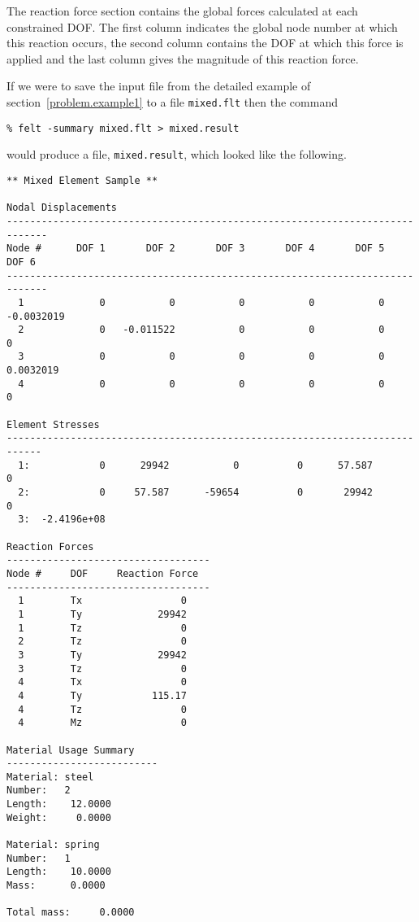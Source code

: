 The reaction force section contains the global forces calculated at each 
constrained DOF.  The first column indicates the global node number at which 
this reaction occurs, the second column contains the DOF at which this force 
is applied and the 
last column gives the magnitude of this reaction force.

If we were to save the input file from the detailed example of 
section~\ref{problem.example1} to a file {\tt mixed.flt} then the command
\begin{screen}
 \begin{verbatim}
% felt -summary mixed.flt > mixed.result
 \end{verbatim}
\end{screen}
would produce a file, {\tt mixed.result}, which looked like the following.
\begin{screen}
 \begin{verbatim}
** Mixed Element Sample **

Nodal Displacements
-----------------------------------------------------------------------------
Node #      DOF 1       DOF 2       DOF 3       DOF 4       DOF 5       DOF 6
-----------------------------------------------------------------------------
  1             0           0           0           0           0  -0.0032019
  2             0   -0.011522           0           0           0           0
  3             0           0           0           0           0   0.0032019
  4             0           0           0           0           0           0

Element Stresses
----------------------------------------------------------------------------
  1:            0      29942           0          0      57.587           0
  2:            0     57.587      -59654          0       29942           0
  3:  -2.4196e+08

Reaction Forces
-----------------------------------
Node #     DOF     Reaction Force
-----------------------------------
  1        Tx                 0
  1        Ty             29942
  1        Tz                 0
  2        Tz                 0
  3        Ty             29942
  3        Tz                 0
  4        Tx                 0
  4        Ty            115.17
  4        Tz                 0
  4        Mz                 0

Material Usage Summary
--------------------------
Material: steel
Number:   2
Length:    12.0000
Weight:     0.0000

Material: spring
Number:   1
Length:    10.0000
Mass:      0.0000

Total mass:     0.0000
 \end{verbatim}
\end{screen}

